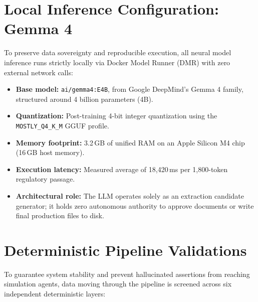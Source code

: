 \documentclass[11pt,a4paper]{article}
\begin{document}
\section{Local Inference Configuration: Gemma 4}

To preserve data sovereignty and reproducible execution, all neural model inference runs strictly locally via Docker Model Runner (DMR) with zero external network calls:

\begin{itemize}[leftmargin=*]
    \item \textbf{Base model:} \texttt{ai/gemma4:E4B}, from Google DeepMind's Gemma 4 family, structured around 4 billion parameters (4B).
    \item \textbf{Quantization:} Post-training 4-bit integer quantization using the \texttt{MOSTLY\_Q4\_K\_M} GGUF profile.
    \item \textbf{Memory footprint:} 3.2\,GB of unified RAM on an Apple Silicon M4 chip (16\,GB host memory).
    \item \textbf{Execution latency:} Measured average of 18,420\,ms per 1,800-token regulatory passage.
    \item \textbf{Architectural role:} The LLM operates solely as an extraction candidate generator; it holds zero autonomous authority to approve documents or write final production files to disk.
\end{itemize}

\section{Deterministic Pipeline Validations}

To guarantee system stability and prevent hallucinated assertions from reaching simulation agents, data moving through the pipeline is screened across six independent deterministic layers:
\end{document}
